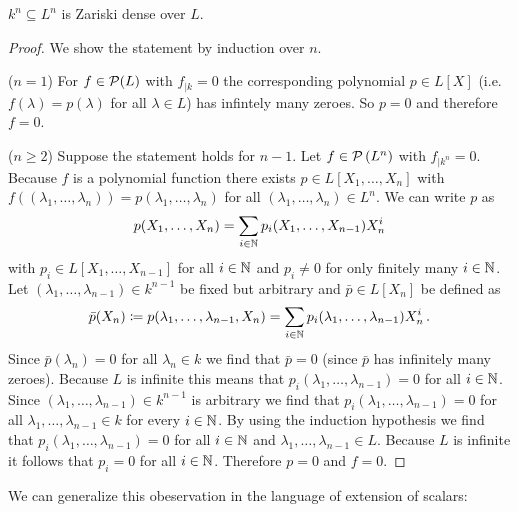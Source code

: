 \begin{lemma}
  $k^n \subseteq L^n$ is Zariski dense over $L$.
\end{lemma}
\begin{proof}
  We show the statement by induction over $n$.
  
  ($n = 1$)
  For $f \in \mathcal{P}(L)$ with $f_{|k} = 0$ the corresponding polynomial $p \in L[X]$ (i.e.\ $f(\lambda) = p(\lambda)$ for all $\lambda \in L$) has infintely many zeroes.
  So $p = 0$ and therefore $f = 0$.
  
  ($n \geq 2$)
  Suppose the statement holds for $n-1$.
  Let $f \in \mathcal{P}\left(L^n\right)$ with $f_{|k^n} = 0$.
  Because $f$ is a polynomial function there exists $p \in L[X_1, \dotsc, X_n]$ with $f((\lambda_1, \dotsc, \lambda_n)) = p(\lambda_1, \dotsc, \lambda_n)$ for all $(\lambda_1, \dotsc, \lambda_n) \in L^n$.
  We can write $p$ as
  \[
      p(X_1, \dotsc, X_n)
    = \sum_{i \in \mathbb{N}} p_i(X_1, \dotsc, X_{n-1}) X_n^i
  \]
  with $p_i \in L[X_1, \dotsc, X_{n-1}]$ for all $i \in \mathbb{N}$ and $p_i \neq 0$ for only finitely many $i \in \mathbb{N}$.
  Let $(\lambda_1, \dotsc, \lambda_{n-1}) \in k^{n-1}$ be fixed but arbitrary and $\bar{p} \in L[X_n]$ be defined as
  \[
              \bar{p}(X_n)
    \coloneqq p(\lambda_1, \dotsc, \lambda_{n-1}, X_n)
    =         \sum_{i \in \mathbb{N}} p_i(\lambda_1, \dotsc, \lambda_{n-1}) X_n^i \,.
  \]
  Since $\bar{p}(\lambda_n) = 0$ for all $\lambda_n \in k$ we find that $\bar{p} = 0$ (since $\bar{p}$ has infinitely many zeroes).
  Because $L$ is infinite this means that $p_i(\lambda_1, \dotsc, \lambda_{n-1}) = 0$ for all $i \in \mathbb{N}$.
  Since $(\lambda_1, \dotsc, \lambda_{n-1}) \in k^{n-1}$ is arbitrary we find that $p_i(\lambda_1, \dotsc, \lambda_{n-1}) = 0$ for all $\lambda_1, \dotsc, \lambda_{n-1} \in k$ for every $i \in \mathbb{N}$.
  By using the induction hypothesis we find that $p_i(\lambda_1, \dotsc, \lambda_{n-1}) = 0$ for all $i \in \mathbb{N}$ and $\lambda_1, \dotsc, \lambda_{n-1} \in L$.
  Because $L$ is infinite it follows that $p_i = 0$ for all $i \in \mathbb{N}$.
  Therefore $p = 0$ and $f = 0$.
\end{proof}


We can generalize this obeservation in the language of extension of scalars:


